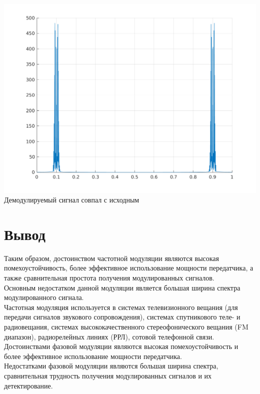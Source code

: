 \documentclass[a4paper]{article}
\begin{document}
\includegraphics[scale=0.7]{lab5/figures/figure_6.png}\\
Демодулируемый сигнал совпал с исходным\\
\section{Вывод}
Таким образом, достоинством частотной модуляции являются высокая помехоустойчивость,
более эффективное использование мощности передатчика, а также
сравнительная простота получения модулированных сигналов.\\
Основным недостатком данной модуляции является большая ширина спектра модулированного сигнала.\\
Частотная модуляция используется в системах телевизионного вещания (для передачи сигналов звукового сопровождения), системах спутникового теле- и радиовещания, системах высококачественного стереофонического вещания (FM диапазон), радиорелейных линиях (РРЛ), сотовой телефонной связи.\\

Достоинствами фазовой модуляции являются высокая помехоустойчивость и более эффективное использование мощности передатчика.\\
Недостатками фазовой модуляции являются большая ширина спектра, сравнительная трудность получения модулированных сигналов и их детектирование.
\end{document}
